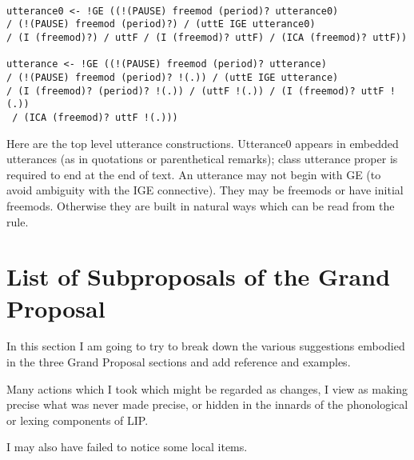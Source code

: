\documentclass[12pt]{article}
\begin{document}
\begin{verbatim}

utterance0 <- !GE ((!(PAUSE) freemod (period)? utterance0) 
/ (!(PAUSE) freemod (period)?) / (uttE IGE utterance0) 
/ (I (freemod)?) / uttF / (I (freemod)? uttF) / (ICA (freemod)? uttF))

utterance <- !GE ((!(PAUSE) freemod (period)? utterance) 
/ (!(PAUSE) freemod (period)? !(.)) / (uttE IGE utterance) 
/ (I (freemod)? (period)? !(.)) / (uttF !(.)) / (I (freemod)? uttF !(.))
 / (ICA (freemod)? uttF !(.)))

\end{verbatim}

Here are the top level utterance constructions.  Utterance0 appears in embedded utterances (as in quotations or parenthetical remarks); class utterance proper is required to end at the end of text.  An utterance may not begin with GE (to avoid ambiguity
with the IGE connective).  They may be freemods or have initial freemods.  Otherwise they are built in natural ways which can be read from the rule.



\section{List of Subproposals of the Grand Proposal}

In this section I am going to try to break down the various suggestions embodied in the three Grand Proposal sections and
add reference and examples.

Many actions which I took which might be regarded as changes, I view as making precise what was never made precise, or hidden in the innards of the phonological or lexing components of LIP.

I may also have failed to notice some local items.
\end{document}
